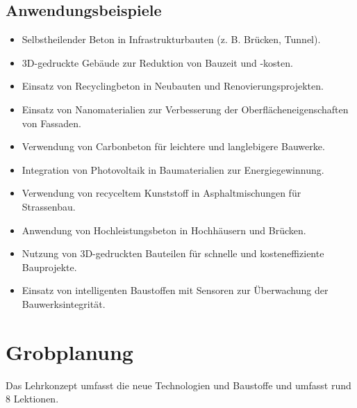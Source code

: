 \documentclass[
11pt,
captions=tableheading,
smallheadings,
headsepline,
footsepline, 
captions=tableheading,
parskip=half-,
]{scrartcl}
\begin{document}
\subsection{Anwendungsbeispiele}
\begin{itemize}
    \item Selbstheilender Beton in Infrastrukturbauten (z. B. Brücken, Tunnel).
    \item 3D-gedruckte Gebäude zur Reduktion von Bauzeit und -kosten.
    \item Einsatz von Recyclingbeton in Neubauten und Renovierungsprojekten.
    \item Einsatz von Nanomaterialien zur Verbesserung der Oberflächeneigenschaften von Fassaden.
    \item Verwendung von Carbonbeton für leichtere und langlebigere Bauwerke.
    \item Integration von Photovoltaik in Baumaterialien zur Energiegewinnung.
    \item Verwendung von recyceltem Kunststoff in Asphaltmischungen für Strassenbau.
    \item Anwendung von Hochleistungsbeton in Hochhäusern und Brücken.
    \item Nutzung von 3D-gedruckten Bauteilen für schnelle und kosteneffiziente Bauprojekte.
    \item Einsatz von intelligenten Baustoffen mit Sensoren zur Überwachung der Bauwerksintegrität.
\end{itemize}




\clearpage
\section{Grobplanung}
Das Lehrkonzept umfasst die neue Technologien und Baustoffe und umfasst rund 8 Lektionen.
\end{document}
